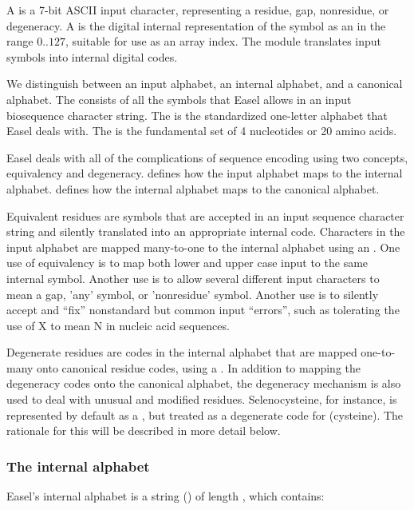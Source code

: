 A  is a 7-bit ASCII input character, representing a
residue, gap, nonresidue, or degeneracy. A  is the
digital internal representation of the symbol as an  in the range $0..127$, suitable for use as an array index. The
 module translates input symbols into internal
digital codes.

We distinguish between an input alphabet, an internal alphabet, and a
canonical alphabet.  The  consists of all the
symbols that Easel allows in an input biosequence character
string. The  is the standardized one-letter
alphabet that Easel deals with. The  is the
fundamental set of 4 nucleotides or 20 amino acids.

Easel deals with all of the complications of sequence encoding using
two concepts, equivalency and degeneracy.  
defines how the input alphabet maps to the internal
alphabet.  defines how the internal alphabet maps
to the canonical alphabet.

Equivalent residues are symbols that are accepted in an input sequence
character string and silently translated into an appropriate internal
code. Characters in the input alphabet are mapped many-to-one to the
internal alphabet using an . One use of equivalency
is to map both lower and upper case input to the same internal
symbol. Another use is to allow several different input characters to
mean a gap, 'any' symbol, or 'nonresidue' symbol. Another use is to
silently accept and ``fix'' nonstandard but common input ``errors'',
such as tolerating the use of X to mean N in nucleic acid sequences.

Degenerate residues are codes in the internal alphabet that are mapped
one-to-many onto canonical residue codes, using a . In addition to mapping the degeneracy codes onto the canonical
alphabet, the degeneracy mechanism is also used to deal with unusual
and modified residues. Selenocysteine, for instance, is represented by
default as a , but treated as a degenerate code for 
(cysteine). The rationale for this will be described in more detail
below.

\subsubsection{The internal alphabet}

Easel's internal alphabet is a string () of length
, which contains:

